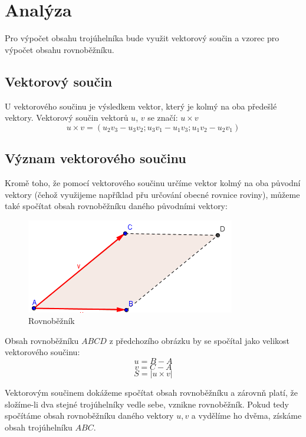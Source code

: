 \chapter{Analýza}
 Pro výpočet obsahu trojúhelníka bude využit vektorový součin a vzorec pro výpočet obsahu rovnoběžníku. 
 
 \section{Vektorový součin}
 U vektorového součinu je výsledkem vektor, který je kolmý na oba předešlé vektory. Vektorový součin vektorů $u$, $v$ se značí: $u \times v$ 
$$ u \times v = (u_2v_3-u_3v_2; u_3v_1-u_1v_3; u_1v_2-u_2v_1)$$

 \section{Význam vektorového součinu}
Kromě toho, že pomocí vektorového součinu určíme vektor kolmý na oba původní vektory (čehož využijeme například přu určování obecné rovnice roviny), můžeme také spočítat obsah rovnoběžníku daného původními vektory:

\begin{figure}[h]
	\centering
	
		\includegraphics[scale=.5]{404.png}
		\caption{Rovnoběžník}
		\label{fig:klient01}
	\end{figure} 

Obsah rovnoběžníku $ABCD$ z předchozího obrázku by se spočítal jako velikost vektorového součinu:
$$u = B - A $$
$$v = C - A $$
$$S = |u \times v |$$

Vektorovým součinem dokážeme spočítat obsah rovnoběžníku a zárovnň platí, že složíme-li dva stejné trojúhelníky vedle sebe, vznikne rovnoběžník. Pokud tedy spočítáme obsah rovnoběžníku daného vektory $u, v$ a vydělíme ho dvěma, získáme obsah trojúhelníku $ABC$.

